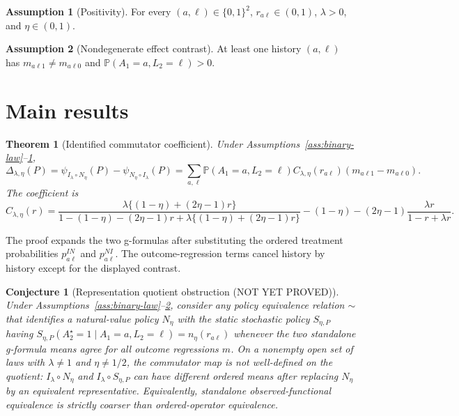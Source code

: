 \documentclass[11pt]{article}
\renewcommand{\Pr}{\mathbb{P}}
\theoremstyle{definition}
\newtheorem{assumption}{Assumption}
\theoremstyle{plain}
\newtheorem{theorem}{Theorem}
\newtheorem{conjecture}{Conjecture}
\theoremstyle{remark}
\begin{document}
\begin{assumption}[Positivity]\label{ass:positivity}
For every \((a,\ell)\in\{0,1\}^2\), \(r_{a\ell}\in(0,1)\), \(\lambda>0\), and \(\eta\in(0,1)\).
\end{assumption}

\begin{assumption}[Nondegenerate effect contrast]\label{ass:effect-contrast}
At least one history \((a,\ell)\) has \(m_{a\ell1}\ne m_{a\ell0}\) and \(\Pr(A_1=a,L_2=\ell)>0\).
\end{assumption}

\section{Main results}
\begin{theorem}[Identified commutator coefficient]\label{thm:coefficient}
Under Assumptions~\ref{ass:binary-law}--\ref{ass:positivity},
\[
\Delta_{\lambda,\eta}(P)=\psi_{I_\lambda\circ N_\eta}(P)-\psi_{N_\eta\circ I_\lambda}(P)
=\sum_{a,\ell}\Pr(A_1=a,L_2=\ell)C_{\lambda,\eta}(r_{a\ell})(m_{a\ell1}-m_{a\ell0}).
\]
The coefficient is
\[
C_{\lambda,\eta}(r)=
\frac{\lambda\{(1-\eta)+(2\eta-1)r\}}{1-(1-\eta)-(2\eta-1)r+\lambda\{(1-\eta)+(2\eta-1)r\}}
-(1-\eta)-(2\eta-1)\frac{\lambda r}{1-r+\lambda r}.
\]
\end{theorem}
The proof expands the two g-formulas after substituting the ordered treatment probabilities \(p^{IN}_{a\ell}\) and \(p^{NI}_{a\ell}\). The outcome-regression terms cancel history by history except for the displayed contrast.

\begin{conjecture}[Representation quotient obstruction (NOT YET PROVED)]\label{conj:quotient}
Under Assumptions~\ref{ass:binary-law}--\ref{ass:effect-contrast}, consider any policy equivalence relation \(\sim\) that identifies a natural-value policy \(N_\eta\) with the static stochastic policy \(S_{\eta,P}\) having \(S_{\eta,P}(A_2^\star=1\mid A_1=a,L_2=\ell)=n_\eta(r_{a\ell})\) whenever the two standalone g-formula means agree for all outcome regressions \(m\). On a nonempty open set of laws with \(\lambda\ne1\) and \(\eta\ne1/2\), the commutator map is not well-defined on the quotient: \(I_\lambda\circ N_\eta\) and \(I_\lambda\circ S_{\eta,P}\) can have different ordered means after replacing \(N_\eta\) by an equivalent representative. Equivalently, standalone observed-functional equivalence is strictly coarser than ordered-operator equivalence.
\end{conjecture}
\end{document}
